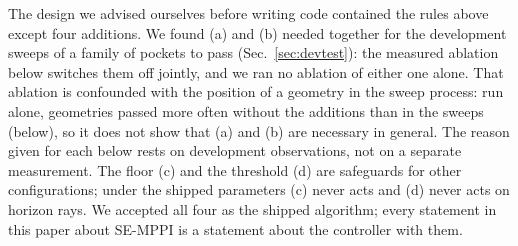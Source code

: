 \documentclass[journal]{IEEEtran}
\begin{document}
The design we advised ourselves before writing code contained the rules above except
four additions. We found (a) and (b) needed together for the development sweeps of a family
of pockets to pass (Sec.~\ref{sec:devtest}): the measured ablation below switches them off
jointly, and we ran no ablation of either one alone. That ablation is confounded with the
position of a geometry in the sweep process: run alone, geometries passed more often without
the additions than in the sweeps (below), so it does not show that (a) and (b) are necessary
in general. The reason given for each below rests on development
observations, not on a separate measurement. The floor (c) and the threshold (d) are safeguards for other
configurations; under the shipped parameters (c) never acts and (d) never acts on horizon
rays. We accepted all four as the shipped algorithm; every statement in this paper about
SE-MPPI is a statement about the controller with them.
\end{document}
